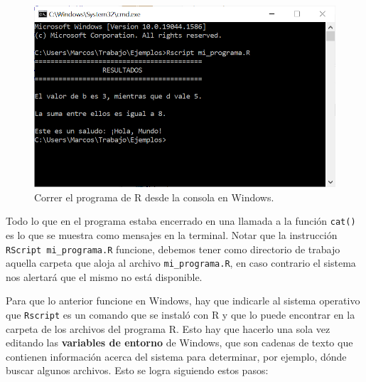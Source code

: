 \documentclass[
]{book}
\begin{document}
\begin{figure}

{\centering \includegraphics[width=0.8\linewidth]{images/07_otros/terminal7} 

}

\caption{Correr el programa de R desde la consola en Windows.}\label{fig:unnamed-chunk-286}
\end{figure}

Todo lo que en el programa estaba encerrado en una llamada a la función \texttt{cat()} es lo que se muestra como mensajes en la terminal. Notar que la instrucción \texttt{RScript\ mi\_programa.R} funcione, debemos tener como directorio de trabajo aquella carpeta que aloja al archivo \texttt{mi\_programa.R}, en caso contrario el sistema nos alertará que el mismo no está disponible.

Para que lo anterior funcione en Windows, hay que indicarle al sistema operativo que \texttt{Rscript} es un comando que se instaló con R y que lo puede encontrar en la carpeta de los archivos del programa R. Esto hay que hacerlo una sola vez editando las \textbf{variables de entorno} de Windows, que son cadenas de texto que contienen información acerca del sistema para determinar, por ejemplo, dónde buscar algunos archivos. Esto se logra siguiendo estos pasos:
\end{document}
